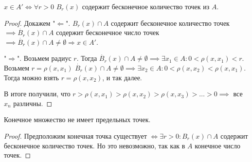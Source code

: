 \begin{theorem}
    $x \in A' \iff \forall r > 0$  $B_r(x)$ содержит бесконечное количество точек из  $A$.
\end{theorem}
\begin{proof}
    Докажем "$\Leftarrow$". $B_r(x) \cap A$ содержит бесконечное количество точек  $\implies \dot{B_r}(x) \cap A$ содержит бесконечное число точек  $\implies \dot{B_r}(x) \cap A \neq \emptyset \Rightarrow x \in A'$.

     "$\Rightarrow$". Возьмем радиус  $r$. Тогда  $\dot{B_r}(x) \cap A \neq \emptyset \implies \exists x_1 \in A\!: 0 < \rho(x, x_1) < r$. Возьмем $r = \rho(x, x_1)$ $\dot{B_r}(x) \cap A \neq \emptyset \implies \exists x_2 \in A\!: 0 < \rho(x, x_2) < \rho(x, x_1)$. Тогда можно взять $r = \rho(x, x_2)$, и так далее. 

     В итоге получили, что $r > \rho(x, x_1) > \rho(x, x_2) > \rho(x, x_3) > \ldots > 0 \implies$ все $x_n$ различны.
\end{proof}
\begin{consequence}
     Конечное множество не имеет предельных точек.
\end{consequence}
\begin{proof}
     Предположим конечная точка существует $\iff \exists r > 0\!: B_r(x) \cap A$ содержит бесконечное количество точек. Но это невозможно, так как в $A$ конечное число точек. 
\end{proof}
